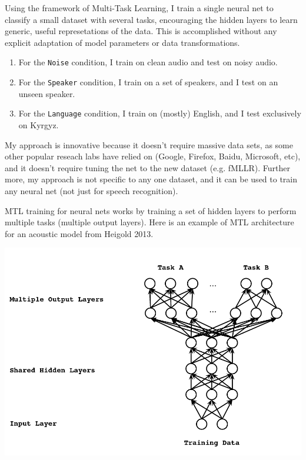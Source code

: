 \documentclass[10pt,a4paper]{article}
\begin{document}
Using the framework of Multi-Task Learning, I train a single neural net to classify a small dataset with several tasks, encouraging the hidden layers to learn generic, useful represetations of the data. This is accomplished without any explicit adaptation of model parameters or data transformations.

\begin{enumerate}
  
\item For the \texttt{Noise} condition, I train on clean audio and test on noisy audio.
\item For the \texttt{Speaker} condition, I train on a set of speakers, and I test on an unseen speaker.
\item For the \texttt{Language} condition, I train on (mostly) English, and I test exclusively on Kyrgyz.
\end{enumerate}
    
My approach is innovative because it doesn't require massive data sets, as some other popular reseach labs have relied on (Google, Firefox, Baidu, Microsoft, etc), and it doesn't require tuning the net to the new dataset (e.g. fMLLR). Further more, my approach is not specific to any one dataset, and it can be used to train any neural net (not just for speech recognition).

MTL training for neural nets works by training a set of hidden layers to perform multiple tasks (multiple output layers). Here is an example of MTL architecture for an acoustic model from Heigold 2013.

\begin{center}
\includegraphics[width=.85\textwidth,keepaspectratio]{figs/heigold-2013-dnn-c.png}
\end{center}
\end{document}
